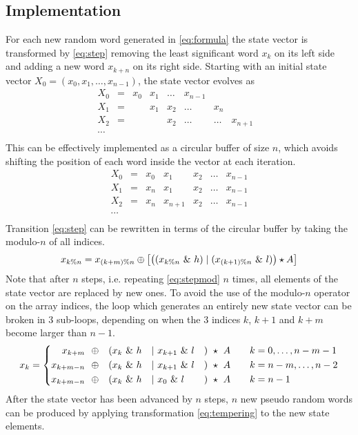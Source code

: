 \documentclass[preprint,1p,times]{elsarticle}
\begin{document}
\subsection{Implementation}
For each new random word generated in \eqref{eq:formula} the state vector is transformed by \eqref{eq:step} removing the least significant word $x_{k}$ on its left side and adding a new word $x_{k+n}$ on its right side. Starting with an initial state vector $X_0=(x_0, x_1, \dots, x_{n-1})$, the state vector evolves as
$$
\begin{matrix}
X_0 &=& x_0 & x_1 & \dots & x_{n-1} &\\
X_1 &=& & x_1 & x_2 & \dots & x_{n} & \\
X_2 &=& & & x_2 & \dots & \dots & x_{n+1} &\\
\cdots \\
\end{matrix}
$$
This can be effectively implemented as a circular buffer of size $n$, which avoids shifting the position of each word inside the vector at each iteration.
\begin{equation}
\label{eq:staterec}
\begin{matrix}
X_0 &=& x_0 & x_1 & x_2 & \dots & x_{n-1} \\
X_1 &=& x_{n} & x_1 & x_2 & \dots & x_{n-1} \\
X_2 &=& x_{n} & x_{n+1} & x_2 & \dots & x_{n-1} \\
\cdots \\
\end{matrix}
\end{equation}
Transition \eqref{eq:step} can be rewritten in terms of the circular buffer by taking the modulo-$n$ of all indices.
\begin{equation}
\label{eq:stepmod}
x_{k\%n} = x_{(k+m)\% n} \mathbin{\oplus} \left[ \left(({x_{k\%n}}~\&~h) \mid (x_{(k+1)\%n}~\&~l)\right) \star A \right]
\end{equation}
Note that after $n$ steps, i.e. repeating \eqref{eq:stepmod} $n$ times, all elements of the state vector are replaced by new ones. To avoid the use of the modulo-$n$ operator on the array indices, the loop which generates an entirely new state vector can be broken in 3 sub-loops, depending on when the 3 indices $k$, $k+1$ and $k+m$ become larger than $n-1$.
\begin{equation}
\label{eq:stepnomod}
	x_k = \left\{
		\begin{aligned}
			x_{k+m}   & ~~\mathbin{\oplus} & ( & x_{k} ~\&~ h & \mid~ & x_{k+1} ~\&~ l & ) &~\star~ A &\quad &k = 0, \dots, n-m-1\\
			x_{k+m-n} & ~~\mathbin{\oplus} & ( & x_{k} ~\&~ h & \mid~ & x_{k+1} ~\&~ l & ) &~\star~ A &\quad &k = n-m, \dots, n-2 \\
			x_{k+m-n} & ~~\mathbin{\oplus} & ( & x_{k} ~\&~ h & \mid~ & x_{0}   ~\&~ l & ) &~\star~ A &\quad &k = n-1
		\end{aligned}
    \right.
\end{equation}
After the state vector has been advanced by $n$ steps, $n$ new pseudo random words can be produced by applying transformation \eqref{eq:tempering} to the new state elements.
\end{document}
